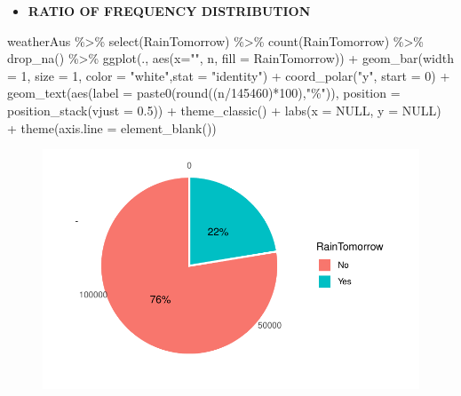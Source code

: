 \documentclass[
  letterpaper,
  DIV=11,
  numbers=noendperiod]{scrartcl}
\newenvironment{Shaded}{\begin{snugshade}}{\end{snugshade}}
\newcommand{\AttributeTok}[1]{\textcolor[rgb]{0.40,0.45,0.13}{#1}}
\newcommand{\ConstantTok}[1]{\textcolor[rgb]{0.56,0.35,0.01}{#1}}
\newcommand{\DecValTok}[1]{\textcolor[rgb]{0.68,0.00,0.00}{#1}}
\newcommand{\FloatTok}[1]{\textcolor[rgb]{0.68,0.00,0.00}{#1}}
\newcommand{\FunctionTok}[1]{\textcolor[rgb]{0.28,0.35,0.67}{#1}}
\newcommand{\NormalTok}[1]{\textcolor[rgb]{0.00,0.23,0.31}{#1}}
\newcommand{\SpecialCharTok}[1]{\textcolor[rgb]{0.37,0.37,0.37}{#1}}
\newcommand{\StringTok}[1]{\textcolor[rgb]{0.13,0.47,0.30}{#1}}
\providecommand{\tightlist}{%
  \setlength{\itemsep}{0pt}\setlength{\parskip}{0pt}}\usepackage{longtable,booktabs,array}
\begin{document}
\begin{itemize}
\tightlist
\item
  \textbf{RATIO OF FREQUENCY DISTRIBUTION}
\end{itemize}

\begin{Shaded}
\begin{Highlighting}[]
\NormalTok{  weatherAus }\SpecialCharTok{\%\textgreater{}\%} \FunctionTok{select}\NormalTok{(RainTomorrow) }\SpecialCharTok{\%\textgreater{}\%}
  \FunctionTok{count}\NormalTok{(RainTomorrow) }\SpecialCharTok{\%\textgreater{}\%} \FunctionTok{drop\_na}\NormalTok{() }\SpecialCharTok{\%\textgreater{}\%}
  \FunctionTok{ggplot}\NormalTok{(., }\FunctionTok{aes}\NormalTok{(}\AttributeTok{x=}\StringTok{""}\NormalTok{, n, }\AttributeTok{fill =}\NormalTok{ RainTomorrow)) }\SpecialCharTok{+}
  \FunctionTok{geom\_bar}\NormalTok{(}\AttributeTok{width =} \DecValTok{1}\NormalTok{, }\AttributeTok{size =} \DecValTok{1}\NormalTok{, }\AttributeTok{color =} \StringTok{"white"}\NormalTok{,}\AttributeTok{stat =} \StringTok{"identity"}\NormalTok{) }\SpecialCharTok{+} \FunctionTok{coord\_polar}\NormalTok{(}\StringTok{"y"}\NormalTok{, }\AttributeTok{start =} \DecValTok{0}\NormalTok{) }\SpecialCharTok{+}
  \FunctionTok{geom\_text}\NormalTok{(}\FunctionTok{aes}\NormalTok{(}\AttributeTok{label =} \FunctionTok{paste0}\NormalTok{(}\FunctionTok{round}\NormalTok{((n}\SpecialCharTok{/}\DecValTok{145460}\NormalTok{)}\SpecialCharTok{*}\DecValTok{100}\NormalTok{),}\StringTok{"\%"}\NormalTok{)),}
            \AttributeTok{position =} \FunctionTok{position\_stack}\NormalTok{(}\AttributeTok{vjust =} \FloatTok{0.5}\NormalTok{)) }\SpecialCharTok{+}
  \FunctionTok{theme\_classic}\NormalTok{() }\SpecialCharTok{+}
  \FunctionTok{labs}\NormalTok{(}\AttributeTok{x =} \ConstantTok{NULL}\NormalTok{, }\AttributeTok{y =} \ConstantTok{NULL}\NormalTok{) }\SpecialCharTok{+}
  \FunctionTok{theme}\NormalTok{(}\AttributeTok{axis.line =} \FunctionTok{element\_blank}\NormalTok{())}
\end{Highlighting}
\end{Shaded}

\begin{figure}[H]

{\centering \includegraphics{RainAus_EDA_files/figure-pdf/unnamed-chunk-7-1.pdf}

}

\end{figure}
\end{document}
